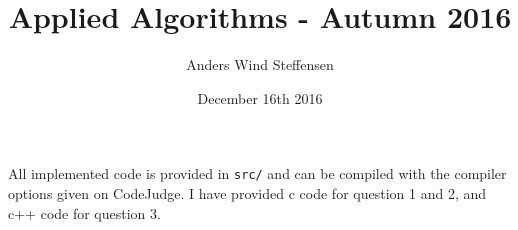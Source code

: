 \documentclass[a4paper]{article}
\title{Applied Algorithms - Autumn 2016}
\author{Anders Wind Steffensen}
\date{December 16th 2016}
\begin{document}
	\hypersetup{pageanchor=false}

	

	\maketitle
	
	All implemented code is provided in \texttt{src/} and can be compiled with the compiler options given on CodeJudge. I have provided c code for question 1 and 2, and c++ code for question 3.

	\vspace{2cm}
	
	\hypersetup{pageanchor=true}

	\tableofcontents

	\clearpage

	
	

	
	
	
	
\end{document}
